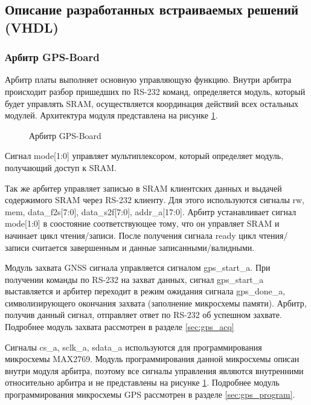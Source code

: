 \subsection{Описание разработанных встраиваемых решений (VHDL)}

\subsubsection{Арбитр GPS-Board}
Арбитр платы выполняет основную управляющую функцию. Внутри арбитра происходит разбор пришедших по RS-232 команд, определяется
модуль, который будет управлять SRAM, осуществляется координация действий всех остальных модулей. Архитектура модуля представлена на
рисунке \ref{pic:arbiter_arch}.

\begin{figure}[H]
\begin{center}
\end{center}
\caption{Арбитр GPS-Board}
\label{pic:arbiter_arch}
\end{figure}

Сигнал mode[1:0] управляет мультиплексором, который определяет модуль, получающий доступ к SRAM. 

Так же арбитер управляет записью в SRAM клиентских данных и выдачей содержимого SRAM через RS-232 клиенту. Для этого используются
сигналы rw, mem, data\_f2s[7:0], data\_s2f[7:0], addr\_a[17:0]. Арбитр устанавливает сигнал mode[1:0] в соостояние соответствующее
тому, что он управляет SRAM и начинает цикл чтения/записи. После получения сигнала ready цикл чтения/записи считается завершенным
и данные записанными/валидными.

Модуль захвата GNSS сигнала управляется сигналом gps\_start\_a.
При получении команды по RS-232 на захват данных, сигнал gps\_start\_a выставляется
и арбитер переходит в режим ожидания сигнала gps\_done\_a, символизирующего окончания захвата (заполнение микросхемы памяти).
Арбитр, получив данный сигнал, отправляет ответ по RS-232 об успешном захвате. Подробнее модуль захвата рассмотрен в разделе
\ref{sec:gps_acq}

Сигналы cs\_a, sclk\_a, sdata\_a используются для программирования микросхемы MAX2769. Модуль программирования данной микросхемы
описан внутри модуля арбитра, поэтому все сигналы управления являются внутренними относительно арбитра и не представлены на рисунке
\ref{pic:arbiter_arch}. Подробнее модуль программирования микросхемы GPS рассмотрен в разделе \ref{sec:gps_program}.

